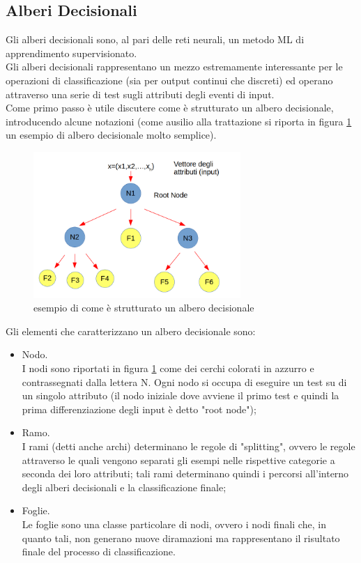 \newpage


\subsection{Alberi Decisionali}
\label{alberi decisionali}
Gli alberi decisionali sono, al pari delle reti neurali, un metodo ML di apprendimento supervisionato.\\
Gli alberi decisionali rappresentano un mezzo estremamente interessante per le operazioni di classificazione (sia per output continui che discreti) ed operano attraverso una serie di test sugli attributi degli eventi di input. \\ 
Come primo passo è utile discutere come è strutturato un albero decisionale, introducendo alcune notazioni (come ausilio alla trattazione si riporta in figura \ref{schemaDT} un esempio di albero decisionale molto semplice). \\

\begin{figure} [h!]
	\centering
	\includegraphics[width=0.70\textwidth]{figs/schemaDT.png}
	\caption{esempio di come è strutturato un albero decisionale}
	\label{schemaDT}
\end{figure} 

Gli elementi che caratterizzano un albero decisionale sono:
\begin{itemize}
	\item Nodo. \\
	I nodi sono riportati in figura \ref{schemaDT} come dei cerchi colorati in azzurro e contrassegnati dalla lettera N. Ogni nodo si occupa di eseguire un test su di un singolo attributo (il nodo iniziale dove avviene il primo test e quindi la prima differenziazione degli input è detto "root node");
	\item Ramo. \\
	I rami (detti anche archi) determinano le regole di "splitting", ovvero le regole attraverso le quali vengono separati gli esempi nelle rispettive categorie a seconda dei loro attributi; tali rami determinano quindi i percorsi all'interno degli alberi decisionali e la classificazione finale;
	\item Foglie. \\
	Le foglie sono una classe particolare di nodi, ovvero i nodi finali che, in quanto tali, non generano nuove diramazioni ma rappresentano il risultato finale del processo di classificazione.
\end{itemize}

